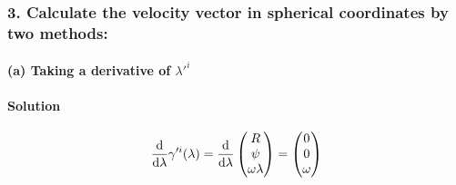 \documentclass{article}
\begin{document}
\subsubsection*{3. Calculate the velocity vector in spherical coordinates by two methods:}
\paragraph{(a) Taking a derivative of $\lambda'^i$}
\paragraph{Solution}

\begin{equation*}
    \dv{\lambda}\gamma'^i(\lambda) = \dv{\lambda} \begin{pmatrix}
            R\\
            \psi\\
            \omega \lambda
        \end{pmatrix}= \begin{pmatrix}
           0\\
           0\\
            \omega
        \end{pmatrix}
\end{equation*}
\end{document}
